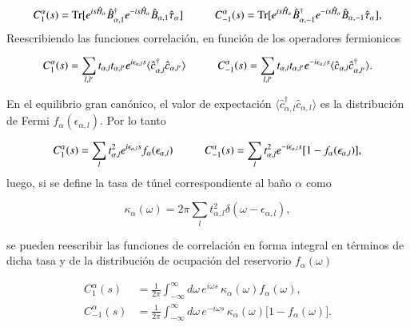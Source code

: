 \begin{appendixs}
\begin{equation*}
    C_{1}^{\alpha}(s) = \text{Tr}[e^{is\hat{H}_{\alpha}}\hat{B}^{\dagger}_{\alpha,1}e^{-is\hat{H}_{\alpha}}\hat{B}_{\alpha,1}\hat{\tau}_{\alpha}  ]  \hspace{10mm} C_{-1}^{\alpha}(s) = \text{Tr}[e^{is\hat{H}_{\alpha}}\hat{B}^{\dagger}_{\alpha,-1}e^{-is\hat{H}_{\alpha}}\hat{B}_{\alpha,-1}\hat{\tau}_{\alpha}  ], 
\end{equation*}
Reescribiendo las funciones correlación, en función de los operadores fermionicos

\begin{equation*}
    C_{1}^{\alpha}(s) = \sum_{l,l'}t_{\alpha,l}t_{\alpha,l'}e^{i\epsilon_{\alpha,l}s} \langle \hat{c}^{\dagger}_{\alpha,l}\hat{c}_{\alpha,l'} \rangle \hspace{10mm} C
    ^{\alpha}_{-1}(s) = \sum_{l,l'}t_{\alpha,l}t_{\alpha,l'}e^{-i\epsilon_{\alpha,l}s} \langle \hat{c}_{\alpha,l}\hat{c}^{\dagger}_{\alpha,l'} \rangle.
\end{equation*}

En el equilibrio gran canónico, el valor de expectación $\langle \hat{c}^{\dagger}_{\alpha,l}\hat{c}_{\alpha,l}\rangle$ es la distribución de Fermi $f_{\alpha}(\epsilon_{\alpha,l})$. Por lo tanto  

\begin{equation*}
    C_{1}^{\alpha}(s) = \sum_{l}t^{2}_{\alpha,l}e^{i\epsilon_{\alpha,l}s} f_{\alpha}(\epsilon_{\alpha,l}) \hspace{10mm} C
    ^{\alpha}_{-1}(s) = \sum_{l}t^{2}_{\alpha,l}e^{-i\epsilon_{\alpha,l}s} [1-f_{\alpha}(\epsilon_{\alpha,l})],
\end{equation*}
luego, si se define la tasa de túnel correspondiente al baño \( \alpha \) como

\begin{equation*}
    \kappa_{\alpha}(\omega) = 2\pi \sum_{l} t_{\alpha,l}^{2} \delta(\omega - \epsilon_{\alpha,l}),
\end{equation*}

se pueden reescribir las funciones de correlación en forma integral en términos de dicha tasa y de la distribución de ocupación del reservorio \( f_\alpha(\omega) \)

\begin{align*}
    C_{1}^{\alpha}(s) &= \frac{1}{2\pi} \int_{-\infty}^{\infty} d\omega\, e^{i\omega s}\, \kappa_{\alpha}(\omega) f_{\alpha}(\omega), \\
    C_{-1}^{\alpha}(s) &= \frac{1}{2\pi} \int_{-\infty}^{\infty} d\omega\, e^{-i\omega s}\, \kappa_{\alpha}(\omega)\big[1 - f_{\alpha}(\omega)\big].
\end{align*}


\end{appendixs}
